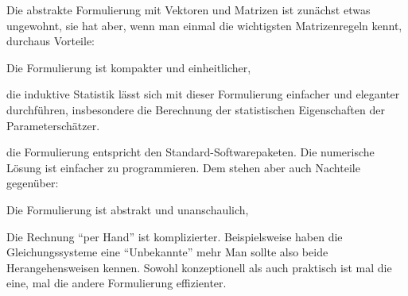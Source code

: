 Die abstrakte Formulierung mit Vektoren und Matrizen ist zun\"achst
etwas ungewohnt, sie hat aber, wenn man einmal die wichtigsten
Matrizenregeln kennt, durchaus Vorteile:
\bi
\item Die Formulierung ist kompakter und einheitlicher,
\item die induktive Statistik l\"asst sich mit dieser Formulierung
einfacher und eleganter durchf\"uhren, insbesondere die Berechnung der
statistischen Eigenschaften der Parametersch\"atzer.
\item die Formulierung entspricht den Standard-Softwarepaketen. Die 
numerische L\"osung ist einfacher zu programmieren.
\ei
Dem stehen aber auch Nachteile gegen\"uber:
\bi
\item Die Formulierung ist abstrakt und unanschaulich,
\item Die Rechnung ``per Hand'' ist komplizierter. Beispielsweise
haben die Gleichungssysteme eine ``Unbekannte'' mehr
\ei
Man sollte also beide Herangehensweisen kennen. Sowohl konzeptionell
als auch praktisch ist mal die eine, mal die andere Formulierung
effizienter.

